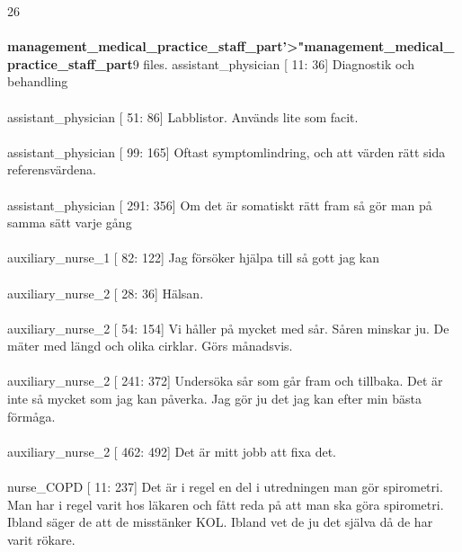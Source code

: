 \documentclass[12pt,a4paper,oneside]{article}
\begin{document}
26 \\\ \\{\bf management\_medical\_practice\_staff\_part'>"management\_medical\_practice\_staff\_part}9 files.
 assistant\_physician [  11:  36] 
Diagnostik och behandling %
\\\ \\
 assistant\_physician [  51:  86] 
Labblistor. Anv{\"a}nds lite som facit. %
\\\ \\
 assistant\_physician [  99: 165] 
Oftast symptomlindring, och att v{\"a}rden r{\"a}tt sida referensv{\"a}rdena.  %
\\\ \\
 assistant\_physician [ 291: 356] 
Om det {\"a}r somatiskt r{\"a}tt fram s{\aa} g{\"o}r man p{\aa} samma s{\"a}tt varje g{\aa}ng %
\\\ \\
 auxiliary\_nurse\_1 [  82: 122] 
Jag f{\"o}rs{\"o}ker hj{\"a}lpa till s{\aa} gott jag kan %
\\\ \\
 auxiliary\_nurse\_2 [  28:  36] 
H{\"a}lsan.  %
\\\ \\
 auxiliary\_nurse\_2 [  54: 154] 
Vi h{\aa}ller p{\aa} mycket med s{\aa}r. S{\aa}ren minskar ju. De m{\"a}ter med l{\"a}ngd och olika cirklar. G{\"o}rs m{\aa}nadsvis. %
\\\ \\
 auxiliary\_nurse\_2 [ 241: 372] 
Unders{\"o}ka s{\aa}r som g{\aa}r fram och tillbaka. Det {\"a}r inte s{\aa} mycket som jag kan p{\aa}verka. Jag g{\"o}r ju det jag kan efter min b{\"a}sta f{\"o}rm{\aa}ga. %
\\\ \\
 auxiliary\_nurse\_2 [ 462: 492] 
Det {\"a}r mitt jobb att fixa det. %
\\\ \\
 nurse\_COPD [  11: 237] 
Det {\"a}r i regel en del i utredningen man g{\"o}r spirometri. Man har i regel varit hos l{\"a}karen och f{\aa}tt reda p{\aa} att man ska g{\"o}ra spirometri. Ibland s{\"a}ger de att de misst{\"a}nker KOL. Ibland vet de ju det sj{\"a}lva d{\aa} de har varit r{\"o}kare. %
\end{document}
